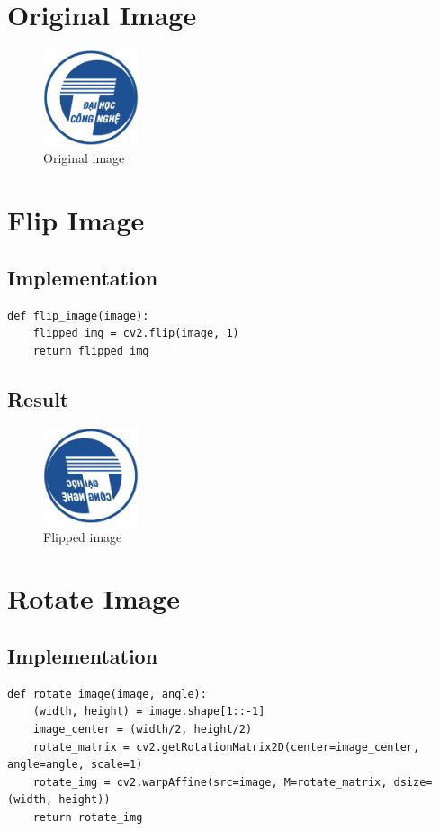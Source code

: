\section{Original Image}
\begin{figure} [h]
    \centering
    \includegraphics[width=0.25\textwidth]{img/uet.png}
    \caption{Original image}
\end{figure}

\section{Flip Image}
\subsection{Implementation}
\begin{verbatim}
def flip_image(image):
    flipped_img = cv2.flip(image, 1)
    return flipped_img    
\end{verbatim}

\subsection{Result}
\begin{figure} [h]
    \centering
    \includegraphics[width=0.25\textwidth]{img/uet_flipped.jpg}
    \caption{Flipped image}
\end{figure}

\newpage
\section{Rotate Image}
\subsection{Implementation}
\begin{verbatim}
def rotate_image(image, angle):
    (width, height) = image.shape[1::-1]
    image_center = (width/2, height/2) 
    rotate_matrix = cv2.getRotationMatrix2D(center=image_center, angle=angle, scale=1)
    rotate_img = cv2.warpAffine(src=image, M=rotate_matrix, dsize=(width, height))
    return rotate_img  
\end{verbatim}

